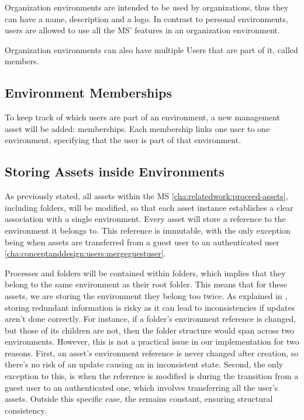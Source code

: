 Organization environments are intended to be used by organizations, thus they can have a
name, description and a logo.
In contrast to personal environments, users are allowed to use all the MS' features in
an organization environment.


Organization environments can also have multiple Users that are part of it,
called members.

\subsection{Environment Memberships}
\label{cha:conceptanddesign:environments:memberships}

To keep track of which users are part of an environment, a new management asset will be
added: memberships.
Each membership links one user to one environment, specifying that the user is part of
that environment.

\subsection{Storing Assets inside Environments}
\label{cha:conceptanddesign:environments:storing-assets}

As previously stated, all assets within the MS \ref{cha:relatedwork:proceed-assets}, including folders,
will be modified, so that each asset instance establishes a clear association with a single environment.
Every asset will store a reference to the environment it belongs to.
This reference is immutable, with the only exception being when assets are transferred
from a guest user to an authenticated user \ref{cha:conceptanddesign:users:mergeguestuser}.

Processes and folders will be contained within folders, which implies that they belong to
the same environment as their root folder.
This means that for these assets, we are storing the environment they belong too twice.
As explained in \cite[1.6.4]{Silberschatz2010}, storing redundant information is risky as 
it can lead to inconsistencies if updates aren't done correctly.
For instance, if a folder's environment reference is changed, but those of its children
are not, then the folder structure would span across two environments.
However, this is not a practical issue in our implementation for two reasons.
First, an asset's environment reference is
never changed after creation, so there’s no risk of an update causing an in inconsistent
state.
Second, the only exception to this, is when the reference is modified is during the transition from a
guest user to an authenticated one, which involves transferring all the user's assets.
Outside this specific case, the remains constant, ensuring structural consistency.

